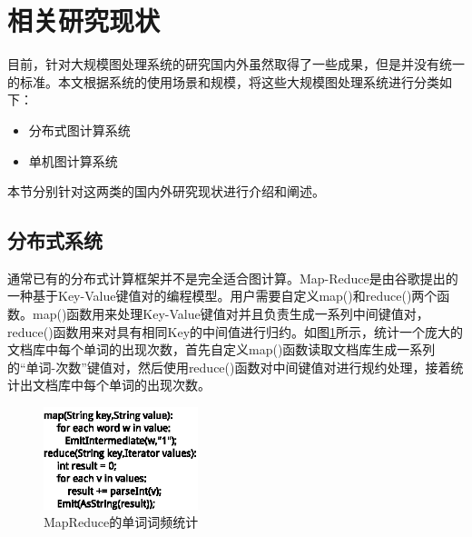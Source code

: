 
\section{相关研究现状}

目前，针对大规模图处理系统的研究国内外虽然取得了一些成果，但是并没有统一的标准。本文根据系统的使用场景和规模，将这些大规模图处理系统进行分类如下：

\begin{itemize}
\item 分布式图计算系统
\item 单机图计算系统
\end{itemize}

本节分别针对这两类的国内外研究现状进行介绍和阐述。

\subsection{分布式系统}

通常已有的分布式计算框架并不是完全适合图计算。Map-Reduce\cite{lammel2008google,dean2008mapreduce}是由谷歌提出的一种基于Key-Value键值对的编程模型。用户需要自定义map()和reduce()两个函数。map()函数用来处理Key-Value键值对并且负责生成一系列中间键值对，reduce()函数用来对具有相同Key的中间值进行归约。如图\ref{fig:mp}所示，统计一个庞大的文档库中每个单词的出现次数，首先自定义map()函数读取文档库生成一系列的“单词-次数”键值对，然后使用reduce()函数对中间键值对进行规约处理，接着统计出文档库中每个单词的出现次数。
\begin{figure}[htbp]
\centering
\includegraphics[width=0.4\textwidth]{myfigures/mapreduce.eps}
\caption{MapReduce的单词词频统计}\label{fig:mp}
\vspace{\baselineskip}
\end{figure}

